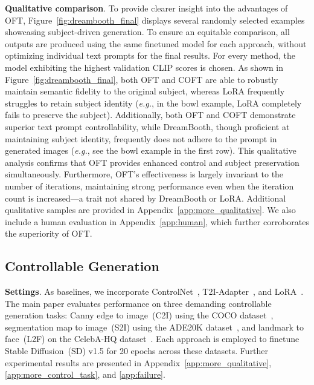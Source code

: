 \textbf{Qualitative comparison}. To provide clearer insight into the advantages of OFT, Figure~\ref{fig:dreambooth_final} displays several randomly selected examples showcasing subject-driven generation. To ensure an equitable comparison, all outputs are produced using the same finetuned model for each approach, without optimizing individual text prompts for the final results. For every method, the model exhibiting the highest validation CLIP scores is chosen. As shown in Figure~\ref{fig:dreambooth_final}, both OFT and COFT are able to robustly maintain semantic fidelity to the original subject, whereas LoRA frequently struggles to retain subject identity (\emph{e.g.}, in the bowl example, LoRA completely fails to preserve the subject). Additionally, both OFT and COFT demonstrate superior text prompt controllability, while DreamBooth, though proficient at maintaining subject identity, frequently does not adhere to the prompt in generated images (\emph{e.g.}, see the bowl example in the first row). This qualitative analysis confirms that OFT provides enhanced control and subject preservation simultaneously. Furthermore, OFT's effectiveness is largely invariant to the number of iterations, maintaining strong performance even when the iteration count is increased—a trait not shared by DreamBooth or LoRA. Additional qualitative samples are provided in Appendix~\ref{app:more_qualitative}. We also include a human evaluation in Appendix~\ref{app:human}, which further corroborates the superiority of OFT.

\subsection{Controllable Generation}

\textbf{Settings}. As baselines, we incorporate ControlNet~\cite{zhang2023adding}, T2I-Adapter~\cite{mou2023t2i}, and LoRA~\cite{hulora2022}. The main paper evaluates performance on three demanding controllable generation tasks: Canny edge to image~(C2I) using the COCO dataset~\cite{lin2014microsoft}, segmentation map to image~(S2I) using the ADE20K dataset~\cite{zhou2017scene}, and landmark to face~(L2F) on the CelebA-HQ dataset~\cite{karras2018progressive,xia2021tedigan}. Each approach is employed to finetune Stable Diffusion~(SD) v1.5 for 20 epochs across these datasets. Further experimental results are presented in Appendix~\ref{app:more_qualitative}, \ref{app:more_control_task}, and \ref{app:failure}.

